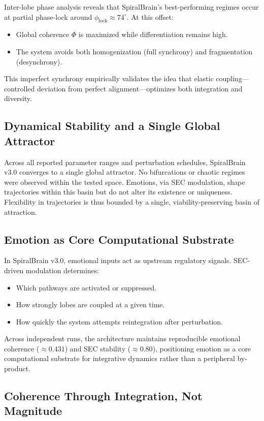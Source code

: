 \documentclass[11pt,a4paper]{article}
\begin{document}
Inter-lobe phase analysis reveals that SpiralBrain's best-performing regimes occur at partial phase-lock around \( \phi_{\text{lock}} \approx 74^\circ \). At this offset:
\begin{itemize}[leftmargin=2em]
    \item Global coherence \( \Phi \) is maximized while differentiation remains high.
    \item The system avoids both homogenization (full synchrony) and fragmentation (desynchrony).
\end{itemize}
This imper\-fect synchrony empirically validates the idea that elastic coupling---controlled deviation from perfect alignment---optimizes both integration and diversity.

\subsection{Dynamical Stability and a Single Global Attractor}

Across all reported parameter ranges and perturbation schedules, SpiralBrain v3.0 converges to a single global attractor. No bifurcations or chaotic regimes were observed within the tested space. Emotions, via SEC modulation, shape trajectories within this basin but do not alter its existence or uniqueness. Flexibility in trajectories is thus bounded by a single, viability-preserving basin of attraction.

\subsection{Emotion as Core Computational Substrate}

In SpiralBrain v3.0, emotional inputs act as upstream regulatory signals. SEC-driven modulation determines:
\begin{itemize}[leftmargin=2em]
    \item Which pathways are activated or suppressed.
    \item How strongly lobes are coupled at a given time.
    \item How quickly the system attempts reintegration after perturbation.
\end{itemize}
Across independent runs, the architecture maintains reproducible emotional coherence (\(\approx 0.431\)) and SEC stability (\(\approx 0.80\)), positioning emotion as a core computational substrate for integrative dynamics rather than a peripheral by-product.

\subsection{Coherence Through Integration, Not Magnitude}
\end{document}
